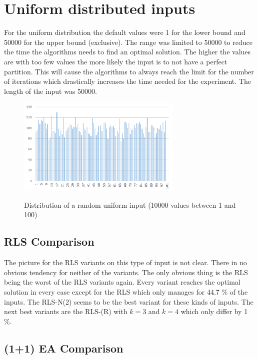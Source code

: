 \section{Uniform distributed inputs}
For the uniform distribution the default values were 1 for the lower bound and 50000 for the upper bound (exclusive).
The range was limited to 50000 to reduce the time the algorithms needs to find an optimal solution.
The higher the values are with too few values the more likely the input is to not have a perfect partition\cite{borgs2001phase}.
This will cause the algorithms to always reach the limit for the number of iterations which drastically increases the time needed for the experiment.
The length of the input was 50000.


\begin{figure}[h]
      \caption{Distribution of a random uniform input (10000 values between 1 and 100)}
      \centering
      \includegraphics[width=0.7\textwidth]{figures/images/numberGenerator/uniformDistributionMin1Max101n10000.png}\label{fig:uniDistExample}
\end{figure}
\subsection{RLS Comparison}




The picture for the RLS variants on this type of input is not clear.
There in no obvious tendency for neither of the variants.
The only obvious thing is the RLS being the worst of the RLS variants again.
Every variant reaches the optimal solution in every case except for the RLS which only manages for 44.7 \% of the inputs.
The RLS-N(2) seems to be the best variant for these kinds of inputs.
The next best variants are the RLS-(R) with $k=3$ and $k=4$ which only differ by 1 \%.

\subsection{(1+1) EA Comparison}


